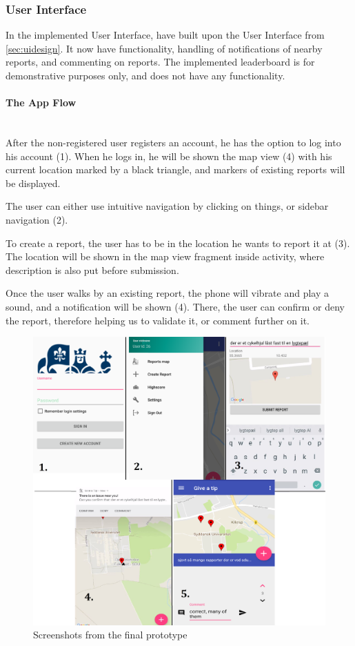 \subsubsection{User Interface}
In the implemented User Interface, have built upon the User Interface from \autoref{sec:uidesign}. It now have functionality, handling of notifications of nearby reports, and commenting on reports. The implemented leaderboard is for demonstrative purposes only, and does not have any functionality.

\paragraph{The App Flow}~\\
After the non-registered user registers an account, he has the option to log into his account (1). 
When he logs in, he will be shown the map view (4) with his current location marked by a black triangle, and markers of existing reports will be displayed. 

The user can either use intuitive navigation by clicking on things, or sidebar navigation (2). 

To create a report, the user has to be in the location he wants to report it at (3). The location will be shown in the map view fragment inside activity, where description is also put before submission. 

Once the user walks by an existing report, the phone will vibrate and play a sound, and a notification will be shown (4). There, the user can confirm or deny the report, therefore helping us to validate it, or comment further on it.

\begin{figure}[H]
\centering
\includegraphics[width=\linewidth]{images/app_design.png}
\caption{Screenshots from the final prototype} \label{fig:appdesign}
\end{figure}


